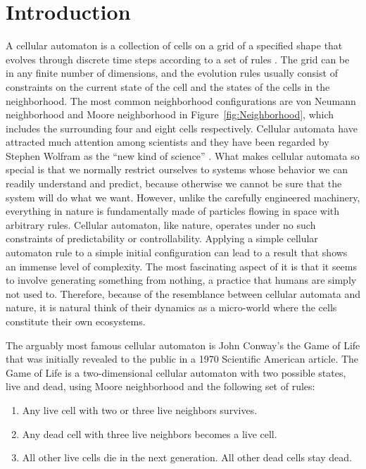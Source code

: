 \documentclass[12pt]{article}
\numberwithin{figure}{section} %
\begin{document}
\section{Introduction}
A cellular automaton is a collection of cells on a grid of a specified shape that evolves through discrete time steps according to a set of rules \cite{Cellular automaton}. The grid can be in any finite number of dimensions, and the evolution rules usually consist of constraints on the current state of the cell and the states of the cells in the neighborhood. The most common neighborhood configurations are von Neumann neighborhood and Moore neighborhood in Figure~\ref{fig:Neighborhood}, which includes the surrounding four and eight cells respectively. Cellular automata have attracted much attention among scientists and they have been regarded by Stephen Wolfram as the “new kind of science” \cite{A new kind of Science}. What makes cellular automata so special is that we normally restrict ourselves to systems whose behavior we can readily understand and predict, because otherwise we cannot be sure that the system will do what we want. However, unlike the carefully engineered machinery, everything in nature is fundamentally made of particles flowing in space with arbitrary rules. Cellular automaton, like nature, operates under no such constraints of predictability or controllability. Applying a simple cellular automaton rule to a simple initial configuration can lead to a result that shows an immense level of complexity. The most fascinating aspect of it is that it seems to involve generating something from nothing, a practice that humans are simply not used to. Therefore, because of the resemblance between cellular automata and nature, it is natural think of their dynamics as a micro-world where the cells constitute their own ecosystems. 

The arguably most famous cellular automaton is John Conway’s the Game of Life \cite{The Game of Life} that was initially revealed to the public in a 1970 Scientific American article. The Game of Life is a two-dimensional cellular automaton with two possible states, live and dead, using Moore neighborhood and the following set of rules: 
\begin{enumerate}[topsep=0pt,itemsep=-1ex,partopsep=1ex,parsep=1ex]
\item Any live cell with two or three live neighbors survives. 
\item Any dead cell with three live neighbors becomes a live cell. 
\item All other live cells die in the next generation. All other dead cells stay dead. 
\end{enumerate}
\end{document}
